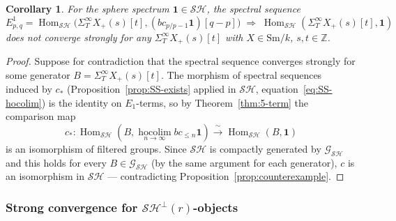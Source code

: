 \documentclass[12pt,a4paper]{article}
\newtheorem{corollary}[theorem]{Corollary}
\theoremstyle{definition}
\newcommand{\Sm}{\mathrm{Sm}}
\newcommand{\SH}{\mathcal{SH}}
\newcommand{\hocolim}{\operatorname*{hocolim}}
\newcommand{\Hom}{\operatorname{Hom}}
\newcommand{\Z}{\mathbb{Z}}
\begin{document}
\begin{corollary}\label{cor:counterexample2}
For the sphere spectrum $\mathbf{1}\in\SH$, the spectral sequence
\[
  E^1_{p,q} = \Hom_{\SH}\!\bigl(\Sigma_T^\infty X_+(s)[t],
    (bc_{p/p-1}\mathbf{1})[q-p]\bigr)
  \;\Rightarrow\;
  \Hom_{\SH}(\Sigma_T^\infty X_+(s)[t],\mathbf{1})
\]
does \emph{not} converge strongly for any $\Sigma_T^\infty X_+(s)[t]$ with
$X\in\Sm/k$, $s,t\in\Z$.
\end{corollary}
\begin{proof}
Suppose for contradiction that the spectral sequence converges strongly for some
generator $B=\Sigma_T^\infty X_+(s)[t]$.  The morphism of spectral sequences induced
by $c_*$ (Proposition~\ref{prop:SS-exists} applied in $\SH$, equation~\eqref{eq:SS-hocolim})
is the identity on $E_1$-terms, so by Theorem~\ref{thm:5-term} the comparison map
\[
  c_*:\Hom_{\SH}(B,\hocolim_{n\to\infty}bc_{\leq n}\mathbf{1})
  \xrightarrow{\;\sim\;} \Hom_{\SH}(B,\mathbf{1})
\]
is an isomorphism of filtered groups.  Since $\SH$ is compactly generated by
$\mathcal{G}_{\SH}$ and this holds for every $B\in\mathcal{G}_{\SH}$
(by the same argument for each generator), $c$ is an isomorphism in $\SH$ — 
contradicting Proposition~\ref{prop:counterexample}.
\end{proof}

\subsubsection{Strong convergence for $\SH^\perp(r)$-objects}
\end{document}
